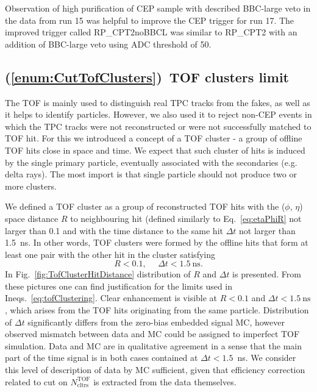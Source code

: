 Observation of high purification of CEP sample with described BBC-large veto in the data from run 15 was helpful to improve the CEP trigger for run 17. The improved trigger called RP\_CPT2noBBCL was similar to RP\_CPT2 with an addition of BBC-large veto using ADC threshold of 50.




\subsection{(\ref{enum:CutTofClusters})~TOF clusters limit}\label{sec:C7}

The TOF is mainly used to distinguish real TPC tracks from the fakes, as well as it helps to identify particles. However, we also used it to reject non-CEP events in which the TPC tracks were not reconstructed or were not successfully matched to TOF hit. For this we introduced a concept of a TOF cluster - a group of offline TOF hits close in space and time. We expect that such cluster of hits is induced by the single primary particle, eventually associated with the secondaries (e.g. delta rays). The most import is that single particle should not produce two or more clusters.

We defined a TOF cluster as a group of reconstructed TOF hits with the ($\phi$, $\eta$) space distance $R$ to neighbouring hit (defined similarly to Eq.~\eqref{eq:etaPhiR} not larger than 0.1 and with the time distance to the same hit $\Delta t$ not larger than 1.5~ns. In other words, TOF clusters were formed by the offline hits that form at least one pair with the other hit in the cluster satisfying
\begin{equation}\label{eq:tofClustering}
 R<0.1,~~~~~~\Delta t<1.5~\text{ns}.
\end{equation}
In Fig.~\ref{fig:TofClusterHitDistance} distribution of $R$ and $\Delta t$ is presented. From these pictures one can find justification for the limits used in Ineqs.~\eqref{eq:tofClustering}. Clear enhancement is visible at $R<0.1$ and $\Delta t<1.5~\text{ns}$, which arises from the TOF hits originating from the same particle. Distribution of $\Delta t$ significantly differs from the zero-bias embedded signal MC, however observed mismatch between data and MC could be assigned to imperfect TOF simulation. Data and MC are in qualitative agreement in a sense that the main part of the time signal is in both cases contained at $\Delta t<1.5$~ns. We consider this level of description of data by MC sufficient, given that efficiency correction related to cut on $N^{\text{TOF}}_{\text{cltrs}}$ is extracted from the data themselves.

